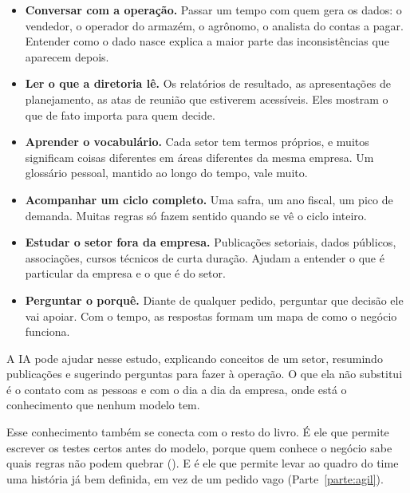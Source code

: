 \begin{itemize}
  \item \textbf{Conversar com a operação.} Passar um tempo com quem gera os dados: o
    vendedor, o operador do armazém, o agrônomo, o analista do contas a pagar. Entender
    como o dado nasce explica a maior parte das inconsistências que aparecem depois.
  \item \textbf{Ler o que a diretoria lê.} Os relatórios de resultado, as apresentações de
    planejamento, as atas de reunião que estiverem acessíveis. Eles mostram o que de fato
    importa para quem decide.
  \item \textbf{Aprender o vocabulário.} Cada setor tem termos próprios, e muitos
    significam coisas diferentes em áreas diferentes da mesma empresa. Um glossário pessoal,
    mantido ao longo do tempo, vale muito.
  \item \textbf{Acompanhar um ciclo completo.} Uma safra, um ano fiscal, um pico de
    demanda. Muitas regras só fazem sentido quando se vê o ciclo inteiro.
  \item \textbf{Estudar o setor fora da empresa.} Publicações setoriais, dados públicos,
    associações, cursos técnicos de curta duração. Ajudam a entender o que é particular da
    empresa e o que é do setor.
  \item \textbf{Perguntar o porquê.} Diante de qualquer pedido, perguntar que decisão ele
    vai apoiar. Com o tempo, as respostas formam um mapa de como o negócio funciona.
\end{itemize}

A IA pode ajudar nesse estudo, explicando conceitos de um setor, resumindo publicações e
sugerindo perguntas para fazer à operação. O que ela não substitui é o contato com as
pessoas e com o dia a dia da empresa, onde está o conhecimento que nenhum modelo tem.

Esse conhecimento também se conecta com o resto do livro. É ele que permite escrever os
testes certos antes do modelo, porque quem conhece o negócio sabe quais regras não podem
quebrar (). E é ele que permite levar ao quadro do time uma história já bem
definida, em vez de um pedido vago (Parte~\ref{parte:agil}).

\begin{leituras}
\end{leituras}
